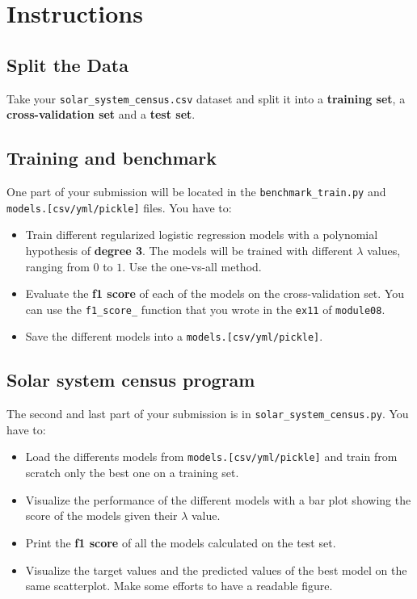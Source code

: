 \section*{Instructions}
\subsection*{Split the Data}

Take your \texttt{solar\_system\_census.csv} dataset and split it into a
 \textbf{training set}, a \textbf{cross-validation set}
and  a \textbf{test set}.

\subsection*{Training and benchmark}
One part of your submission will be located in the \texttt{benchmark\_train.py} and 
\texttt{models.[csv/yml/pickle]} files.
You have to:
\begin{itemize}
  \item Train different regularized logistic regression models with a polynomial hypothesis of \textbf{degree 3}.
        The models will be trained with different $\lambda$ values, ranging from $0$ to $1$.
        Use the one-vs-all method.
  \item Evaluate the \textbf{f1 score} of each of the models on the cross-validation set.
        You can use the \texttt{f1\_score\_} function that you wrote in the \texttt{ex11} of \texttt{module08}.
  \item Save the different models into a \texttt{models.[csv/yml/pickle]}.
\end{itemize}

\subsection*{Solar system census program}
The second and last part of your submission is in \texttt{solar\_system\_census.py}. You have to:
\begin{itemize}
  \item Load the differents models from \texttt{models.[csv/yml/pickle]} and train from scratch 
  only the best one on a training set.
  \item Visualize the performance of the different models with a bar plot showing the score of
   the models given their $\lambda$ value.
  \item Print the \textbf{f1 score} of all the models calculated on the test set.
  \item Visualize the target values and the predicted values of the best model on the same scatterplot. 
  Make some efforts to have a readable figure.
\end{itemize}

